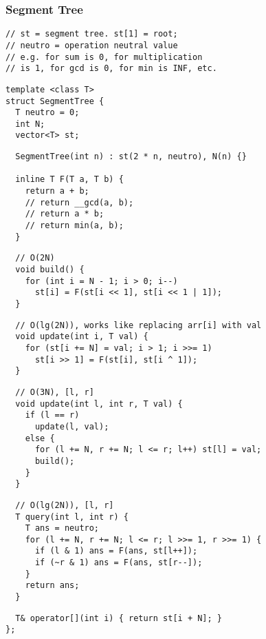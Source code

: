 \documentclass[twoside]{article}
\begin{document}
\begin{multicols*}{2}
\subsubsection*{Segment Tree}
\begin{verbatim}
// st = segment tree. st[1] = root;
// neutro = operation neutral value
// e.g. for sum is 0, for multiplication
// is 1, for gcd is 0, for min is INF, etc.
\end{verbatim}
\vspace{-12pt}
\begin{verbatim}
template <class T>
struct SegmentTree {
  T neutro = 0;
  int N;
  vector<T> st;
\end{verbatim}
\vspace{-12pt}
\begin{verbatim}
  SegmentTree(int n) : st(2 * n, neutro), N(n) {}

  inline T F(T a, T b) {
    return a + b;
    // return __gcd(a, b);
    // return a * b;
    // return min(a, b);
  }
\end{verbatim}
\vspace{-12pt}
\begin{verbatim}
  // O(2N)
  void build() {
    for (int i = N - 1; i > 0; i--)
      st[i] = F(st[i << 1], st[i << 1 | 1]);
  }
\end{verbatim}
\vspace{-12pt}
\begin{verbatim}
  // O(lg(2N)), works like replacing arr[i] with val
  void update(int i, T val) {
    for (st[i += N] = val; i > 1; i >>= 1)
      st[i >> 1] = F(st[i], st[i ^ 1]);
  }
\end{verbatim}
\vspace{-12pt}
\begin{verbatim}
  // O(3N), [l, r]
  void update(int l, int r, T val) {
    if (l == r)
      update(l, val);
    else {
      for (l += N, r += N; l <= r; l++) st[l] = val;
      build();
    }
  }
\end{verbatim}
\vspace{-12pt}
\begin{verbatim}
  // O(lg(2N)), [l, r]
  T query(int l, int r) {
    T ans = neutro;
    for (l += N, r += N; l <= r; l >>= 1, r >>= 1) {
      if (l & 1) ans = F(ans, st[l++]);
      if (~r & 1) ans = F(ans, st[r--]);
    }
    return ans;
  }
\end{verbatim}
\vspace{-12pt}
\begin{verbatim}
  T& operator[](int i) { return st[i + N]; }
};
\end{verbatim}


\end{multicols*}
\end{document}
